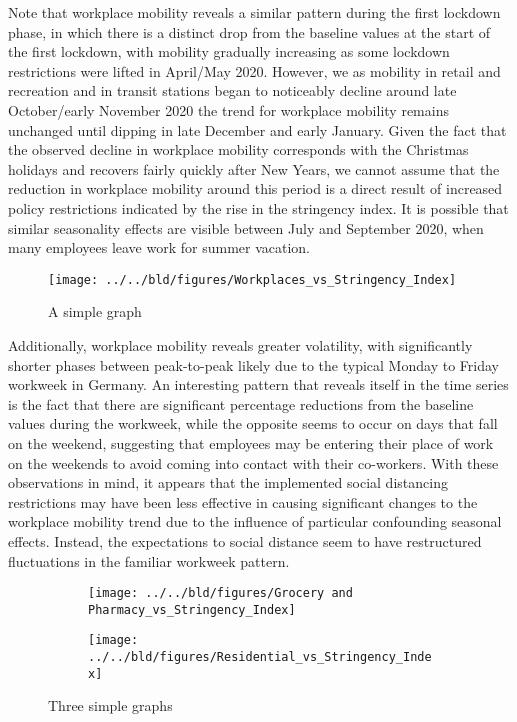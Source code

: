 Note that workplace mobility reveals a similar pattern during the first lockdown phase, in which there is a distinct drop from the baseline values at the start of the first lockdown, with mobility gradually increasing as some lockdown restrictions were lifted in April/May 2020. However, we as mobility in retail and recreation and in transit stations began to noticeably decline around late October/early November 2020 the trend for workplace mobility remains unchanged until dipping in late December and early January. Given the fact that the observed decline in workplace mobility corresponds with the Christmas holidays and recovers fairly quickly after New Years, we cannot assume that the reduction in workplace mobility around this period is a direct result of increased policy restrictions indicated by the rise in the stringency index. It is possible that similar seasonality effects are visible between July and September 2020, when many employees leave work for summer vacation.

\begin{figure}[H]
      \centering
      \texttt{[image: ../../bld/figures/Workplaces\_vs\_Stringency\_Index]}
      \label{fig:five over x}
      \caption{A simple graph}
      \label{fig:simplegraph}
\end{figure}

Additionally, workplace mobility reveals greater volatility, with significantly shorter phases between peak-to-peak likely due to the typical Monday to Friday workweek in Germany. An interesting pattern that reveals itself in the time series is the fact that there are significant percentage reductions from the baseline values during the workweek, while the opposite seems to occur on days that fall on the weekend, suggesting that employees may be entering their place of work on the weekends to avoid coming into contact with their co-workers. With these observations in mind, it appears that the implemented social distancing restrictions may have been less effective in causing significant changes to the workplace mobility trend due to the influence of particular confounding seasonal effects. Instead, the expectations to social distance seem to have restructured fluctuations in the familiar workweek pattern.

\begin{figure}[H]
     \centering
     \begin{subfigure}[b]{\textwidth}
         \centering
         \texttt{[image: ../../bld/figures/Grocery and Pharmacy\_vs\_Stringency\_Index]}
         \caption{}
         \label{fig:y equals x}
     \end{subfigure}
     \hfill
     \begin{subfigure}[b]{\textwidth}
         \centering
         \texttt{[image: ../../bld/figures/Residential\_vs\_Stringency\_Index]}
         \caption{}
         \label{fig:three sin x}
     \end{subfigure}
        \caption{Three simple graphs}
         \label{fig:four graphs}
\end{figure}

